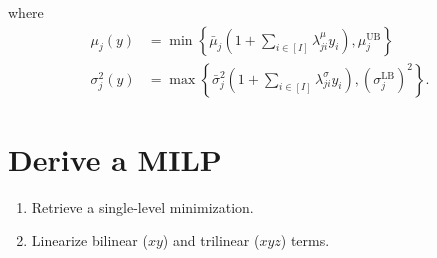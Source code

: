 \documentclass{beamer}
\begin{document}
\begin{frame}[allowframebreaks]
	\framebreak
	\begin{definition}
		where
		\begin{align*}
			\mu_j(y) &= \min\left\{\bar{\mu}_j \left(1 + \sum_{i \in [I]} \lambda_{ji}^\mu y_i\right), \mu_j^{\mathrm{UB}}\right\} \\
			\sigma_j^2(y) &= \max\left\{\bar{\sigma}_j^2 \left(1 + \sum_{i \in [I]} \lambda_{ji}^\sigma y_i\right), (\sigma_j^{\mathrm{LB}})^2\right\}.
		\end{align*}
	\end{definition}
\end{frame}

\section{Derive a MILP} %
\begin{frame}
	\begin{enumerate}
		\item Retrieve a single-level minimization.
		\item Linearize bilinear ($xy$) and trilinear ($xyz$) terms.
	\end{enumerate}
\end{frame}
\end{document}
